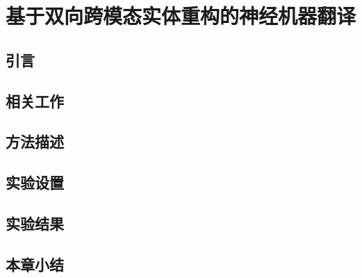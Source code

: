 \chapter{基于双向跨模态实体重构的神经机器翻译}

\section{引言}

\section{相关工作}

\section{方法描述}

\section{实验设置}

\section{实验结果}

\section{本章小结}
